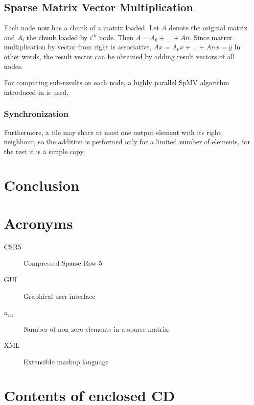 \documentclass[thesis=M,english]{FITthesis}[2019/12/23]
\begin{document}
\section{Sparse Matrix Vector Multiplication}

Each node now has a chunk of a matrix loaded. Let $A$ denote the original matrix 
and $A_{i}$ the chunk loaded by $i^{th}$ node. Then $A = A_{0} + ... + A{n}$. Since 
matrix multiplication by vector from right is associative, $Ax = A_{0}x + ... + A{n}x = y$
In other words, the result vector can be obtained by adding result vectors of all nodes. 

For computing sub-results on each node, a highly parallel SpMV algorithm introduced in 
\cite{liu2015csr5} is used.

\subsection{Synchronization}

Furthermore, a tile may share at most one output element with its right neighbour, so 
the addition is performed only for a limited number of elements, for the rest it is 
a simple copy. 









\chapter{Conclusion}





\appendix

\chapter{Acronyms}
\begin{description}
    \item[CSR5] Compressed Sparse Row 5
    \item[GUI] Graphical user interface
    \item[$n_{nz}$] Number of non-zero elements in a sparse matrix.
    \item[XML] Extensible markup language
\end{description}


\chapter{Contents of enclosed CD}

\end{document}
